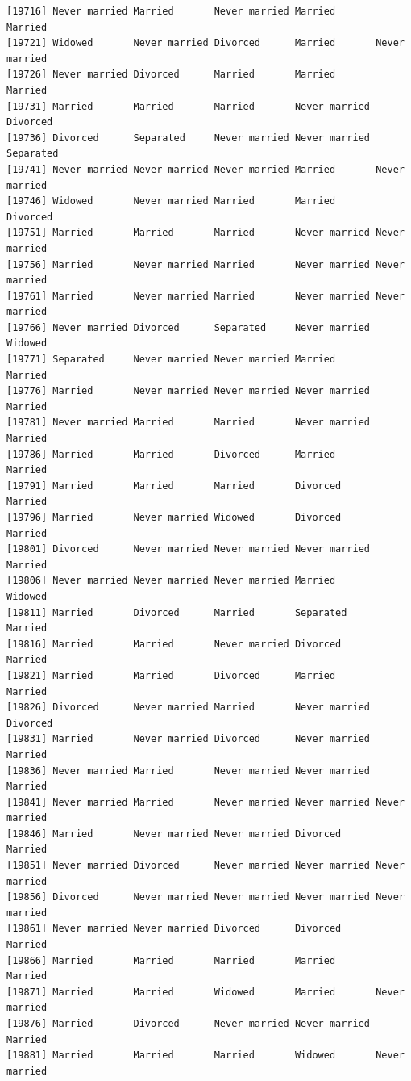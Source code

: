 \documentclass[
  letterpaper,
  DIV=11,
  numbers=noendperiod,
  oneside]{scrartcl}
\begin{document}
\begin{verbatim}
[19716] Never married Married       Never married Married       Married      
[19721] Widowed       Never married Divorced      Married       Never married
[19726] Never married Divorced      Married       Married       Married      
[19731] Married       Married       Married       Never married Divorced     
[19736] Divorced      Separated     Never married Never married Separated    
[19741] Never married Never married Never married Married       Never married
[19746] Widowed       Never married Married       Married       Divorced     
[19751] Married       Married       Married       Never married Never married
[19756] Married       Never married Married       Never married Never married
[19761] Married       Never married Married       Never married Never married
[19766] Never married Divorced      Separated     Never married Widowed      
[19771] Separated     Never married Never married Married       Married      
[19776] Married       Never married Never married Never married Married      
[19781] Never married Married       Married       Never married Married      
[19786] Married       Married       Divorced      Married       Married      
[19791] Married       Married       Married       Divorced      Married      
[19796] Married       Never married Widowed       Divorced      Married      
[19801] Divorced      Never married Never married Never married Married      
[19806] Never married Never married Never married Married       Widowed      
[19811] Married       Divorced      Married       Separated     Married      
[19816] Married       Married       Never married Divorced      Married      
[19821] Married       Married       Divorced      Married       Married      
[19826] Divorced      Never married Married       Never married Divorced     
[19831] Married       Never married Divorced      Never married Married      
[19836] Never married Married       Never married Never married Married      
[19841] Never married Married       Never married Never married Never married
[19846] Married       Never married Never married Divorced      Married      
[19851] Never married Divorced      Never married Never married Never married
[19856] Divorced      Never married Never married Never married Never married
[19861] Never married Never married Divorced      Divorced      Married      
[19866] Married       Married       Married       Married       Married      
[19871] Married       Married       Widowed       Married       Never married
[19876] Married       Divorced      Never married Never married Married      
[19881] Married       Married       Married       Widowed       Never married

\end{verbatim}
\end{document}
